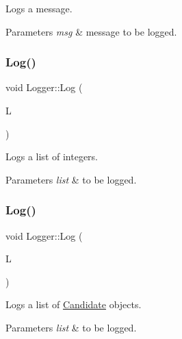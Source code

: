 Logs a message. 


\begin{DoxyParams}{Parameters}
{\em msg} & message to be logged. \\
\hline
\end{DoxyParams}
\mbox{\label{classLogger_a7436e95d0e81bdb0e1b3a4c78cdb9ed2}} 
\subsubsection{\texorpdfstring{Log()}{Log()}\hspace{0.1cm}{\footnotesize\ttfamily [2/4]}}
{\footnotesize\ttfamily void Logger\+::\+Log (\begin{DoxyParamCaption}\item[{std\+::list$<$ int $>$ \&}]{L }\end{DoxyParamCaption})}



Logs a list of integers. 


\begin{DoxyParams}{Parameters}
{\em list} & to be logged. \\
\hline
\end{DoxyParams}
\mbox{\label{classLogger_a5273a101444fc160d1a0935b6448e791}} 
\subsubsection{\texorpdfstring{Log()}{Log()}\hspace{0.1cm}{\footnotesize\ttfamily [3/4]}}
{\footnotesize\ttfamily void Logger\+::\+Log (\begin{DoxyParamCaption}\item[{std\+::list$<$ \hyperlink{classCandidate}{Candidate} $\ast$$>$}]{L }\end{DoxyParamCaption})}



Logs a list of \hyperlink{classCandidate}{Candidate} objects. 


\begin{DoxyParams}{Parameters}
{\em list} & to be logged. \\
\hline
\end{DoxyParams}
\mbox{\label{classLogger_a99456033df2a51e976709037ad85cd11}} 
